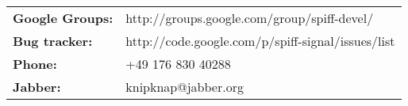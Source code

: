 \begin{tabular}{ll}
{\bf Google Groups:} & http://groups.google.com/group/spiff-devel/ \\
{\bf Bug tracker:}   & http://code.google.com/p/spiff-signal/issues/list \\
{\bf Phone:}         & +49 176 830 40288 \\
{\bf Jabber:}        & knipknap@jabber.org
\end{tabular}
